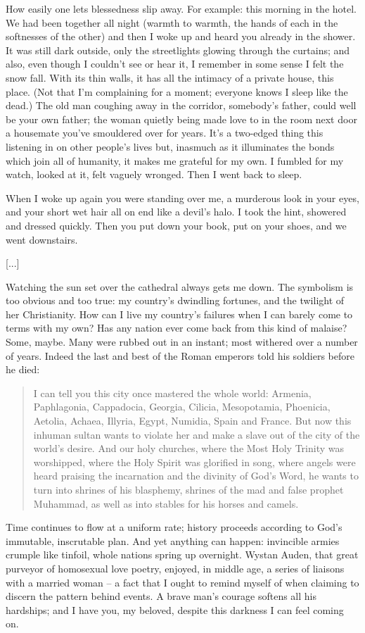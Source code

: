 How easily one lets blessedness slip away. For example: this morning in the hotel. We had been together all night (warmth to warmth, the hands of each in the softnesses of the other) and then I woke up and heard you already in the shower. It was still dark outside, only the streetlights glowing through the curtains; and also, even though I couldn't see or hear it, I remember in some sense I felt the snow fall. With its thin walls, it has all the intimacy of a private house, this place. (Not that I'm complaining for a moment; everyone knows I sleep like the dead.) The old man coughing away in the corridor, somebody's father, could well be your own father; the woman quietly being made love to in the room next door a housemate you've smouldered over for years. It's a two-edged thing this listening in on other people's lives but, inasmuch as it illuminates the bonds which join all of humanity, it makes me grateful for my own. I fumbled for my watch, looked at it, felt vaguely wronged. Then I went back to sleep.

When I woke up again you were standing over me, a murderous look in your eyes, and your short wet hair all on end like a devil's halo. I took the hint, showered and dressed quickly. Then you put down your book, put on your shoes, and we went downstairs.

[...]

Watching the sun set over the cathedral always gets me down. The symbolism is too obvious and too true: my country's dwindling fortunes, and the twilight of her Christianity. How can I live my country's failures when I can barely come to terms with my own? Has any nation ever come back from this kind of malaise? Some, maybe. Many were rubbed out in an instant; most withered over a number of years. Indeed the last and best of the Roman emperors told his soldiers before he died:

\begin{quote}
    I can tell you this city once mastered the whole world: Armenia, Paphlagonia, Cappadocia, Georgia, Cilicia, Mesopotamia, Phoenicia, Aetolia, Achaea, Illyria, Egypt, Numidia, Spain and France. But now this inhuman sultan wants to violate her and make a slave out of the city of the world's desire. And our holy churches, where the Most Holy Trinity was worshipped, where the Holy Spirit was glorified in song, where angels were heard praising the incarnation and the divinity of God's Word, he wants to turn into shrines of his blasphemy, shrines of the mad and false prophet Muhammad, as well as into stables for his horses and camels.
\end{quote}

Time continues to flow at a uniform rate; history proceeds according to God's immutable, inscrutable plan. And yet anything can happen: invincible armies crumple like tinfoil, whole nations spring up overnight. Wystan Auden, that great purveyor of homosexual love poetry, enjoyed, in middle age, a series of liaisons with a married woman -- a fact that I ought to remind myself of when claiming to discern the pattern behind events. A brave man's courage softens all his hardships; and I have you, my beloved, despite this darkness I can feel coming on.
